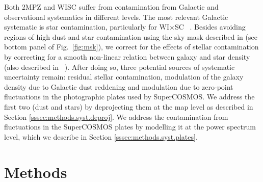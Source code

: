 \documentclass[useAMS,usenatbib]{mn2e}
\newcommand{\wisc}{WI$\times$SC}
\def\citejap#1{\citeauthor{#1}\ \citeyear{#1}}
\begin{document}
    Both 2MPZ and WISC suffer from contamination from Galactic and observational systematics in different levels. The most relevant Galactic systematic is star contamination, particularly for \wisc~ \citep{2018arXiv181208182X}. Besides avoiding regions of high dust and star contamination using the sky mask described in \cite{2018MNRAS.481.1133P} (see bottom panel of Fig.\!~\ref{fig:msk}), we correct for the effects of stellar contamination by correcting for a smooth non-linear relation between galaxy and star density (also described in \citejap{2018MNRAS.481.1133P}). After doing so, three potential sources of systematic uncertainty remain: residual stellar contamination, modulation of the galaxy density due to Galactic dust reddening and modulation due to zero-point fluctuations in the photographic plates used by SuperCOSMOS. We address the first two (dust and stars) by deprojecting them at the map level as described in Section \ref{sssec:methods.syst.deproj}. We address the contamination from fluctuations in the SuperCOSMOS plates by modelling it at the power spectrum level, which we describe in Section \ref{sssec:methods.syst.plates}.

\section{Methods}\label{sec:methods}
\end{document}
